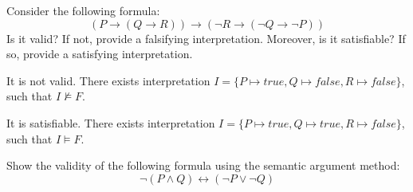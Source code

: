 \documentclass[11pt,a4paper]{article}
\newcommand{\lequiv}{\leftrightarrow}
\begin{document}
\newpage
{}

\subproblem Consider the following formula:
$$(P \to (Q \to R)) \to (\lnot R \to (\lnot Q \to \lnot P))$$
Is it valid? If not, provide a falsifying interpretation.
Moreover, is it satisfiable? If so, provide a satisfying interpretation.

\begin{solution}
    It is not valid. There exists interpretation $I = \{P \mapsto true, Q \mapsto false, R \mapsto false \}$, such that $I \not\models F$.
    
    It is satisfiable. There exists interpretation $I = \{P \mapsto true, Q \mapsto true, R \mapsto false\}$, such that $I \models F$.
\end{solution}

\subproblem Show the validity of the following formula using the semantic argument method:
$$\lnot(P \land Q) \lequiv (\lnot P \lor \lnot Q)$$
\end{document}
